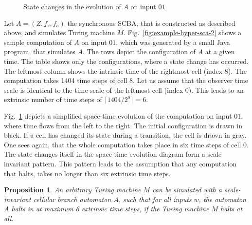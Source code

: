 \documentclass[pre,amssymb,showpacs,showkeys,preprint]{revtex4}
\newtheorem{prop}{Proposition}
\begin{document}
\begin{figure}
\begin{center}
\caption{\label{fig:changed-cells} State changes in the evolution of $A$ on input $01$.}
\end{center}
\end{figure}

Let $A=(Z, f_s, f_a)$ the synchronous SCBA, that is constructed as described above, and simulates
Turing machine $M$.
Fig.~\ref{fig:example-hyper-sca-2} shows a sample computation of $A$ on input $01$, which was
generated by a small Java program, that simulates $A$.
The rows depict the configuration of $A$ at a given time.
The table shows only the configurations, where a state change has occurred.
The leftmost column shows the intrinsic time of the rightmost cell (index 8).
The computation takes 1404 time steps of cell 8.
Let us assume that the observer time scale is identical to the time scale of the leftmost cell
(index 0).
This leads to an extrinsic number of time steps of $\lceil 1404 / 2^8 \rceil = 6$.

Fig.~\ref{fig:changed-cells} depicts a simplified space-time evolution
of the computation on input $01$, where time flows from the left to the right.
The initial configuration is drawn in black.
If a cell has changed its state during a transition, the cell is drawn in gray.
One sees again, that the whole computation takes place in six time steps of cell 0.
The state changes itself in the space-time evolution diagram form a scale invariant pattern.
This pattern leads to the assumption that any computation that halts, takes no longer than
six extrinsic time steps.

\begin{prop}
An arbitrary Turing machine $M$ can be simulated with a scale-invariant cellular branch automaton
$A$, such that for all inputs $w$, the automaton $A$ halts in at maximum 6 extrinsic time steps,
if the Turing machine $M$ halts at all.
\end{prop}
\end{document}
